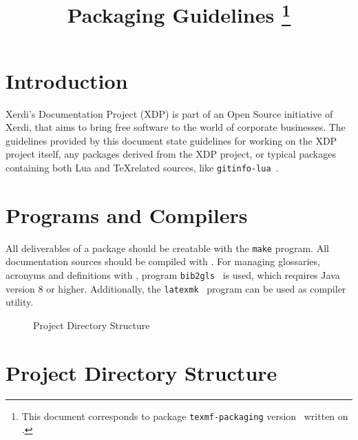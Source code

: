 \documentclass{xdpdoc}
\title{Packaging Guidelines%
    \thanks{This document corresponds to package \texttt{texmf-packaging} version \gitversion\ written on \gitdate.}%
}
\begin{document}
    \maketitle
    \section*{Introduction}

    Xerdi's Documentation Project (XDP) is part of an Open Source initiative of Xerdi, that aims to bring free software to the world of corporate businesses.
    The guidelines provided by this document state guidelines for working on the XDP project itself, any packages derived from the XDP project, or typical \LuaLaTeX packages containing both Lua and \TeX related sources, like \texttt{gitinfo-lua}~\cite{gitinfo-lua}.


    \section{Programs and Compilers}

    All deliverables of a package should be creatable with the \texttt{make} program.
    All documentation sources should be compiled with \LuaLaTeX.
    For managing glossaries, acronyms and definitions with \BibTeX, program \texttt{bib2gls}~\cite{bib2gls} is used, which requires Java version 8 or higher.
    Additionally, the \texttt{latexmk}~\cite{latexmk} program can be used as compiler utility.


    \begin{wrapfigure}{r}{7cm}
        \vspace*{-1.1cm}%
        \caption{Project Directory Structure}\label{fig:project dir}
        \vspace{-.5cm}
    \end{wrapfigure}

    \section{Project Directory Structure}\label{sec:pds}
\end{document}
